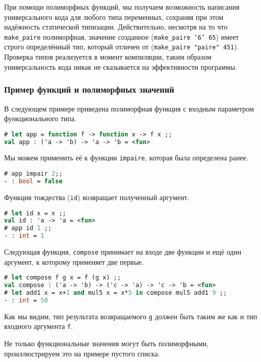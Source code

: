 При помощи полиморфных функций, мы получаем возможность написания универсального
кода для любого типа переменных, сохраняя при этом надёжность статической
типизации. Действительно, несмотря на то что \texttt{make\_paire} полиморфная,
значение созданное (\texttt{make\_paire '6' 65}) имеет строго определённый тип,
который отличен от (\texttt{make\_paire "paire" 451}). Проверка типов
реализуется в момент компиляции, таким образом универсальность кода никак не
сказывается на эффективности программы.

\subsubsection{Пример функций и полиморфных значений}

В следующем примере приведена полиморфная функция с входным параметром
функционального типа.

\begin{lstlisting}[language=OCaml]
# let app = function f -> function x -> f x ;;
val app : ('a -> 'b) -> 'a -> 'b = <fun>
\end{lstlisting}

Мы можем применить её к функции \texttt{impaire}, которая была определена ранее.

\begin{lstlisting}[language=OCaml]
# app impair 2;;
- : bool = false
\end{lstlisting}

Функция тождества (\texttt{id}) возвращает полученный аргумент.

\begin{lstlisting}[language=OCaml]
# let id x = x ;;
val id : 'a -> 'a = <fun>
# app id 1 ;;
- : int = 1
\end{lstlisting}

Следующая функция, \texttt{compose} принимает на входе две функции и ещё один
аргумент, к которому применяет две первые.

\begin{lstlisting}[language=OCaml]
# let compose f g x = f (g x) ;;
val compose : ('a -> 'b) -> ('c -> 'a) -> 'c -> 'b = <fun>
# let add1 x = x+1 and mul5 x = x*5 in compose mul5 add1 9 ;;
- : int = 50
\end{lstlisting}

Как мы видим, тип результата возвращаемого \texttt{g} должен быть таким же как и
тип входного аргумента \texttt{f}.

Не только функциональные значения могут быть полиморфными, проиллюстрируем это
на примере пустого списка.

